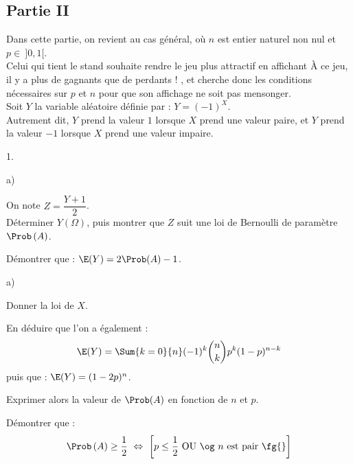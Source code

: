 \newpage


\subsection*{Partie II}

\noindent
Dans cette partie, on revient au cas général, où $n$ est entier
naturel non nul et $p \in \ ]0,1[$.\\
Celui qui tient le stand souhaite rendre le jeu plus attractif en
affichant \og À ce jeu, il y a plus de gagnants que de perdants ! \fg,
et cherche donc les conditions nécessaires sur $p$ et $n$ pour que son
affichage ne soit pas mensonger.\\
Soit $Y$ la variable aléatoire définie par : $Y = (-1)^{X}$.\\
Autrement dit, $Y$ prend la valeur $1$ lorsque $X$ prend une valeur
paire, et $Y$ prend la valeur $-1$ lorsque $X$ prend une valeur
impaire.
\begin{noliste}{1.}
  \setlength{\itemsep}{4mm}
\item
  \begin{noliste}{a)} 
    \setlength{\itemsep}{2mm}
  \item On note $Z = \dfrac{Y + 1}{2}$.\\[.2cm]
    Déterminer $Y(\Omega)$, puis montrer que $Z$ suit une loi de
    Bernoulli de paramètre $\Prob\left( A \right)$.

    

  \item Démontrer que : $\E(Y) = 2 \Prob(A) - 1$.

    
  \end{noliste}




\item 
  \begin{noliste}{a)}
    \setlength{\itemsep}{2mm}
  \item Donner la loi de $X$.

    

  \item En déduire que l'on a également : 
    \[
    \E(Y) = \Sum{k = 0}{n} (-1)^{k} \dbinom{n}{k} p^{k}(1-p)^{n-k}
    \]
    puis que : $\E(Y) = (1-2p)^{n}$.

    
  \end{noliste}

\item Exprimer alors la valeur de $\Prob(A)$ en fonction de $n$ et
  $p$.

  




\item Démontrer que :
  \[
  \Prob\left(A\right) \geq \dfrac{1}{2} \ \Leftrightarrow \ \left[ p
    \leq \dfrac{1}{2} \hbox{ OU \og $n$ est pair \fg{}} \right]
  \]

  

\end{noliste}


